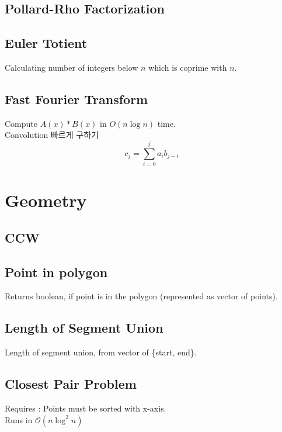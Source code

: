 \documentclass[landscape,8pt]{article}
\begin{document}
\begin{multicols}{2}
  \subsection{Pollard-Rho Factorization}
    

  \subsection{Euler Totient}
  Calculating number of integers below $n$ which is coprime with $n$.
    


  \subsection{Fast Fourier Transform}
    Compute $A(x) * B(x)$ in $O(n\log n)$ time.\\
    Convolution 빠르게 구하기 \[ c_j = \sum_{i = 0}^{j} a_i b_{j-i}\]
    

\section{Geometry}
  \subsection{CCW}
    

  \subsection{Point in polygon}
    Returns boolean, if point is in the polygon (represented as vector of points).
    
  \subsection{Length of Segment Union}
    Length of segment union, from vector of \{start, end\}.
    
  \subsection{Closest Pair Problem}
    Requires : Points must be sorted with x-axis.\\
    Runs in $\mathcal{O}(n \log^2 n)$
    

\end{multicols}
\end{document}
